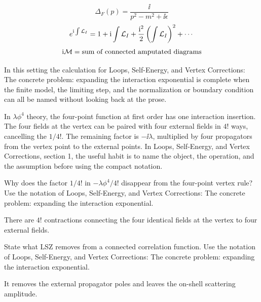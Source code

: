 \[
  \Delta_F(p)=\frac{\ii}{p^2-m^2+\ii\epsilon}
\]
\[
  e^{\mathrm i\int\mathcal L_I}=1+\mathrm i\int\mathcal L_I+\frac{\mathrm i^2}{2}\left(\int\mathcal L_I\right)^2+\cdots
\]
\[
  \mathrm i\mathcal M=\hbox{sum of connected amputated diagrams}
\]

In this setting the calculation for Loops, Self-Energy, and Vertex Corrections: The concrete problem: expanding the interaction exponential is complete when the finite model, the limiting step, and the normalization or boundary condition can all be named without looking back at the prose.




\begin{example}
In \(\lambda\phi^4\) theory, the four-point function at first order has one interaction insertion.  The four fields at the vertex can be paired with four external fields in \(4!\) ways, cancelling the \(1/4!\).  The remaining factor is \(-\ii\lambda\), multiplied by four propagators from the vertex point to the external points.  In Loops, Self-Energy, and Vertex Corrections, section 1, the useful habit is to name the object, the operation, and the assumption before using the compact notation.
\end{example}



\begin{exercise}
Why does the factor \(1/4!\) in \(-\lambda\phi^4/4!\) disappear from the four-point vertex rule?  Use the notation of Loops, Self-Energy, and Vertex Corrections: The concrete problem: expanding the interaction exponential.
\begin{answer}
There are \(4!\) contractions connecting the four identical fields at the vertex to four external fields.
\end{answer}
\end{exercise}

\begin{exercise}
State what LSZ removes from a connected correlation function.  Use the notation of Loops, Self-Energy, and Vertex Corrections: The concrete problem: expanding the interaction exponential.
\begin{answer}
It removes the external propagator poles and leaves the on-shell scattering amplitude.
\end{answer}
\end{exercise}



